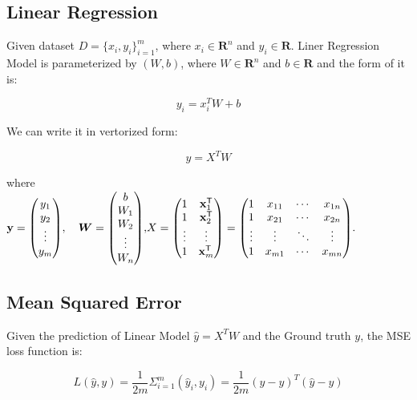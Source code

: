 \documentclass[journal, a4paper]{IEEEtran}
\begin{document}
\subsection{Linear Regression}
Given dataset $ D=\{x_{i}, y_{i}\}_{i=1}^{m}$, where $x_{i} \in \mathbf{R}^{n}$ and $y_{i} \in \mathbf{R}$.
Liner Regression Model is parameterized by $(W, b)$, where $W \in \mathbf{R}^{n}$ and $b \in \mathbf{R}$ and the form of it is:
 \begin{center}
 	\begin{equation}
 	y_{i} = x_{i}^{T}W + b
 	\end{equation}
 \end{center} 
We can write it in vertorized form:
 \begin{center}
	\begin{equation}
	y = X^{T}W
	\end{equation}
\end{center} 
where \\
$\mathbf {y} ={\begin{pmatrix}y_{1}\\y_{2}\\\vdots \\y_{m}\end{pmatrix}},\quad 
{\displaystyle {\boldsymbol {W }}={\begin{pmatrix}b \\W_{1}\\W_{2}\\\vdots \\W_{n}\end{pmatrix}},} \\
{\displaystyle X={\begin{pmatrix}1&\mathbf{x} _{1}^{\mathsf {T}}\\1&\mathbf {x} _{2}^{\mathsf {T}}\\\vdots&\vdots \\1&\mathbf {x} _{m}^{\mathsf {T}}\end{pmatrix}}={\begin{pmatrix}1&x_{11}&\cdots &x_{1n}\\1&x_{21}&\cdots &x_{2n}\\\vdots &\vdots &\ddots &\vdots \\1&x_{m1}&\cdots &x_{mn}\end{pmatrix}}.} \\
$
\subsection{Mean Squared Error}
Given the prediction of Linear Model $\hat{y} = X^{T}W $ and the Ground truth $y$, the MSE loss function is:
 \begin{center}
	\begin{equation}
	L(\hat{y}, y) = \frac{1}{2m} \Sigma_{i=1}^{m}(\hat{y}_i, y_i) 
				= \frac{1}{2m}(\hat{y} - y)^{T}(\hat{y} - y)
	\end{equation}
\end{center} 
\end{document}
